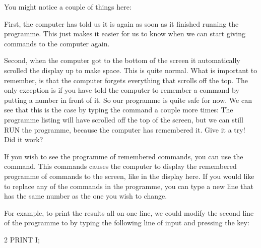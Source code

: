   You might notice a couple of things here:

  First, the computer has told us it is  again
  as soon as it finished running the programme. This just makes it easier for us to know when we
  can start giving commands to the computer again.

  Second, when the computer got to the bottom of the screen
  it automatically scrolled the display up to make space.  This is quite normal.  What is important
  to remember, is that the computer forgets everything that scrolls off the top.  The only exception
  is if you have told the computer to remember a command by putting a number in front of it.  So
  our programme is quite safe for now. We can see that this is the case by typing the  command a
  couple more times: The programme listing will have scrolled off the top of the screen, but we can
  still RUN the programme, because the computer has remembered it.  Give it a try!
  Did it work?

\needspace{4cm} %
  If you wish to see the programme of remembered commands, you can use the 
  command.  This commands causes the computer to display the remembered programme of commands to the screen, like in the display here.
  If you would like to replace any of the commands in the programme, you can type a new line that has the same number as the one you
  wish to change. 


\needspace{4cm} %
  For example, to print the results all on one line, we could modify the second line of the programme to  by
  typing the following line of input and pressing the  key:


  
\begin{screenoutput}
2 PRINT I;
\end{screenoutput}


\needspace{4cm} %

